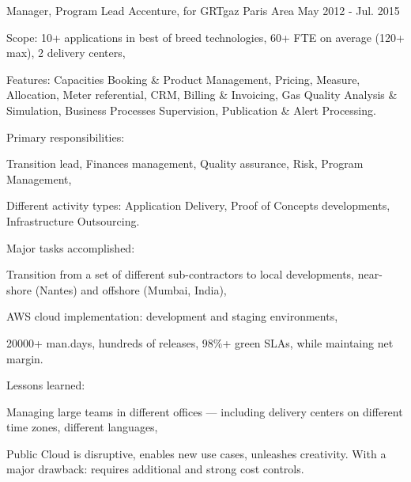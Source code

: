 \begin{cventries}
  \cventry
    {Manager, Program Lead} %
    {Accenture, for GRTgaz} %
    {Paris Area} %
    {May 2012 - Jul. 2015} %
    {
      \begin{cvitems} %
        \item {Scope: 10+ applications in best of breed technologies, 60+ FTE on average (120+ max), 2 delivery centers,}
        \item {Features: Capacities Booking \& Product Management, Pricing, Measure, Allocation, Meter referential, CRM, Billing \& Invoicing, Gas Quality Analysis \& Simulation, Business Processes Supervision, Publication \& Alert Processing.}
        \item {Primary responsibilities:}
        \begin{cvsubitems}
          \item {Transition lead, Finances management, Quality assurance, Risk, Program Management,}
          \item {Different activity types: Application Delivery, Proof of Concepts developments, Infrastructure Outsourcing.}
        \end{cvsubitems}
        \item {Major tasks accomplished:}
        \begin{cvsubitems}
          \item {Transition from a set of different sub-contractors to local developments, near-shore (Nantes) and offshore (Mumbai, India),}
          \item {AWS cloud implementation: development and staging environments,}
          \item {20000+ man.days, hundreds of releases, 98\%+ green SLAs, while maintaing net margin.}
        \end{cvsubitems}
        \item {Lessons learned:}
        \begin{cvsubitems}
          \item {Managing large teams in different offices --- including delivery centers on different time zones, different languages,}
          \item {Public Cloud is disruptive, enables new use cases, unleashes creativity. With a major drawback: requires additional and strong cost controls.}
        \end{cvsubitems}
      \end{cvitems}
    }


\end{cventries}
